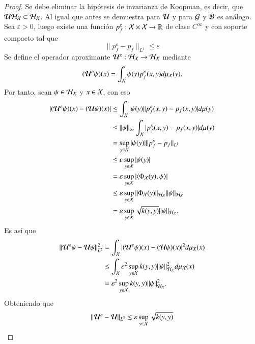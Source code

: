 \begin{proof}
    Se debe eliminar la hipótesis de invarianza de Koopman, es decir, que $\mathcal{U} \mathcal{H}_{\mathcal{X}} \subset \mathcal{H}_{\mathcal{X}}$. Al igual que antes se demuestra para $\mathcal{U}$ y para $\mathcal{G}$ y $\mathcal{B}$ es análogo.  
    Sea $\varepsilon > 0$, luego existe una función $p^\varepsilon_f : \mathcal{X} \times \mathcal{X} \to \mathbb{R}$ de clase $C^\infty$ y con soporte compacto tal que 
    \[
    \| p^\varepsilon_f - p_f\|_{L^1} \leq \varepsilon
    \]
    Se define el operador aproximante $\mathcal{U}^\varepsilon : \mathcal{H}_{\mathcal{X}} \to \mathcal{H}_{\mathcal{X}}$ mediante
    \[
    (\mathcal{U}^\varepsilon \psi) (x) = \int_{\mathcal{X}} \psi (y) p^\varepsilon_f (x, y) d \mu_{\mathcal{X}} (y).
    \]
    Por tanto, sean $\psi \in \mathcal{H}_{\mathcal{X}}$ y $x \in \mathcal{X}$, con eso
    \[
    \begin{aligned}
        |(\mathcal{U}^\varepsilon \psi) (x) - (\mathcal{U} \psi) (x)| & \leq \int_{\mathcal{X}} |\psi (y)| |p^\varepsilon_f (x, y) - p_f (x, y)| d \mu (y) \\
        & \leq \| \psi \|_\infty \int_{\mathcal{X}} |p^\varepsilon_f (x, y) - p_f (x, y)| d \mu (y) \\
        & = \sup_{y \in \mathcal{X}} |\psi (y)| \| p^\varepsilon_f - p_f\|_{L^1} \\
        & \leq \varepsilon \sup_{y \in \mathcal{X}} |\psi (y)| \\
        & = \varepsilon \sup_{y \in \mathcal{X}} |\langle \Phi_{\mathcal{X}} (y), \psi \rangle| \\
        & \leq \varepsilon \sup_{y \in \mathcal{X}} \| \Phi_{\mathcal{X}} (y) \|_{\mathcal{H}_{\mathcal{X}}} \| \psi \|_{\mathcal{H}_{\mathcal{X}}} \\
        & = \varepsilon \sup_{y \in \mathcal{X}} \sqrt{k(y,y)} \| \psi \|_{\mathcal{H}_{\mathcal{X}}}.
    \end{aligned}
    \]
    Es así que
    \[
    \begin{aligned}
        \|\mathcal{U}^\varepsilon \psi - \mathcal{U} \psi \|_{L^2}^2 &= \int_{\mathcal{X}} |(\mathcal{U}^\varepsilon \psi) (x) - (\mathcal{U} \psi) (x)|^2 d \mu_X (x) \\
        &\leq \int_{\mathcal{X}} \varepsilon^2 \sup_{y \in \mathcal{X}} k(y,y) \| \psi \|_{\mathcal{H}_{\mathcal{X}}}^2 d \mu_{\mathcal{X}} (x) \\
        & = \varepsilon^2 \sup_{y \in \mathcal{X}} k(y,y) \| \psi \|_{\mathcal{H}_{\mathcal{X}}}^2.
    \end{aligned}
    \]
    Obteniendo que
    \[
    \|\mathcal{U}^\varepsilon - \mathcal{U} \|_{L^2} \leq \varepsilon \sup_{y \in \mathcal{X}} \sqrt{k(y,y)}
    \]


\end{proof}

